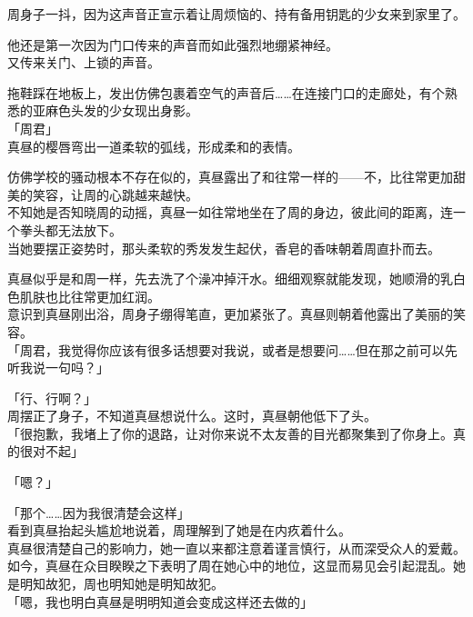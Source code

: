 周身子一抖，因为这声音正宣示着让周烦恼的、持有备用钥匙的少女来到家里了。

他还是第一次因为门口传来的声音而如此强烈地绷紧神经。\\

又传来关门、上锁的声音。

拖鞋踩在地板上，发出仿佛包裹着空气的声音后……在连接门口的走廊处，有个熟悉的亚麻色头发的少女现出身影。\\

「周君」\\

真昼的樱唇弯出一道柔软的弧线，形成柔和的表情。

仿佛学校的骚动根本不存在似的，真昼露出了和往常一样的——不，比往常更加甜美的笑容，让周的心跳越来越快。\\

不知她是否知晓周的动摇，真昼一如往常地坐在了周的身边，彼此间的距离，连一个拳头都无法放下。\\

当她要摆正姿势时，那头柔软的秀发发生起伏，香皂的香味朝着周直扑而去。

真昼似乎是和周一样，先去洗了个澡冲掉汗水。细细观察就能发现，她顺滑的乳白色肌肤也比往常更加红润。\\

意识到真昼刚出浴，周身子绷得笔直，更加紧张了。真昼则朝着他露出了美丽的笑容。\\

「周君，我觉得你应该有很多话想要对我说，或者是想要问……但在那之前可以先听我说一句吗？」

「行、行啊？」\\

周摆正了身子，不知道真昼想说什么。这时，真昼朝他低下了头。\\

「很抱歉，我堵上了你的退路，让对你来说不太友善的目光都聚集到了你身上。真的很对不起」

「嗯？」

「那个……因为我很清楚会这样」\\

看到真昼抬起头尴尬地说着，周理解到了她是在内疚着什么。\\

真昼很清楚自己的影响力，她一直以来都注意着谨言慎行，从而深受众人的爱戴。如今，真昼在众目睽睽之下表明了周在她心中的地位，这显而易见会引起混乱。她是明知故犯，周也明知她是明知故犯。\\

「嗯，我也明白真昼是明明知道会变成这样还去做的」

